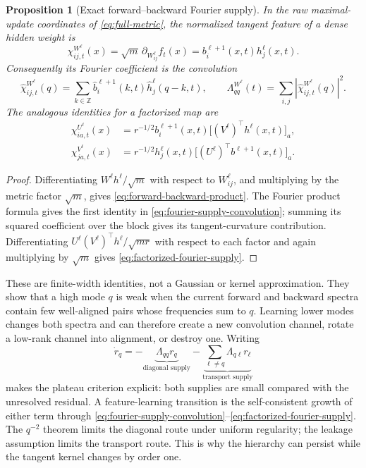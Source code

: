\documentclass[11pt]{article}
\newcommand{\1}{\mathbf 1}
\theoremstyle{plain}
\newtheorem{proposition}[theorem]{Proposition}
\theoremstyle{definition}
\begin{document}
\begin{proposition}[Exact forward--backward Fourier supply]
\label{prop:fourier-supply}
In the raw maximal-update coordinates of \cref{eq:full-metric}, the
normalized tangent feature of a dense hidden weight is
\begin{equation}
 \chi_{ij,t}^{W^\ell}(x)
 =\sqrt m\,\partial_{W^\ell_{ij}}f_t(x)
 =b_i^{\ell+1}(x,t)h_j^\ell(x,t).
 \label{eq:forward-backward-product}
\end{equation}
Consequently its Fourier coefficient is the convolution
\begin{equation}
 \widehat\chi_{ij,t}^{W^\ell}(q)
 =\sum_{k\in\mathbb Z}
 \widehat b_i^{\ell+1}(k,t)\widehat h_j^\ell(q-k,t),
 \qquad
 \Lambda_{qq}^{W^\ell}(t)
 =\sum_{i,j}\left|\widehat\chi_{ij,t}^{W^\ell}(q)\right|^2.
 \label{eq:fourier-supply-convolution}
\end{equation}
The analogous identities for a factorized map are
\begin{align}
 \chi_{ia,t}^{U^\ell}(x)
 &=r^{-1/2}b_i^{\ell+1}(x,t)
   \big[(V^\ell)^\top h^\ell(x,t)\big]_a,\nonumber\\
 \chi_{ja,t}^{V^\ell}(x)
 &=r^{-1/2}h_j^\ell(x,t)
   \big[(U^\ell)^\top b^{\ell+1}(x,t)\big]_a.
 \label{eq:factorized-fourier-supply}
\end{align}
\end{proposition}

\begin{proof}
Differentiating \(W^\ell h^\ell/\sqrt m\) with respect to
\(W^\ell_{ij}\), and multiplying by the metric factor \(\sqrt m\), gives
\eqref{eq:forward-backward-product}.  The Fourier product formula gives the
first identity in \eqref{eq:fourier-supply-convolution}; summing its squared
coefficient over the block gives its tangent-curvature contribution.
Differentiating
\(U^\ell(V^\ell)^\top h^\ell/\sqrt{mr}\) with respect to each factor and
again multiplying by \(\sqrt m\) gives
\eqref{eq:factorized-fourier-supply}.
\end{proof}

These are finite-width identities, not a Gaussian or kernel approximation.
They show that a high mode \(q\) is weak when the current
forward and backward spectra contain few well-aligned pairs whose
frequencies sum to \(q\).  Learning lower modes changes both spectra and can
therefore create a new convolution channel, rotate a low-rank channel into
alignment, or destroy one.  Writing
\begin{equation}
 \dot r_q=-\underbrace{\Lambda_{qq}r_q}_{\text{diagonal supply}}
 -\underbrace{\sum_{\ell\ne q}\Lambda_{q\ell}r_\ell}_{\text{transport supply}}
 \label{eq:supply-decomposition}
\end{equation}
makes the plateau criterion explicit: both supplies are small compared with
the unresolved residual.  A feature-learning transition is the
self-consistent growth of either term through
\eqref{eq:fourier-supply-convolution}--\eqref{eq:factorized-fourier-supply}.
The \(q^{-2}\) theorem limits the diagonal route under uniform regularity;
the leakage assumption limits the transport route.  This is why the
hierarchy can persist while the tangent kernel changes by order one.
\end{document}

